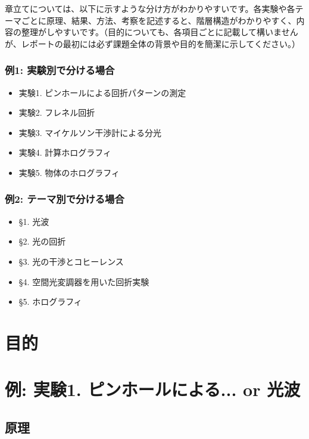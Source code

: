 \documentclass[uplatex,dvipdfmx,a4j,12pt]{jsarticle}
\begin{document}
章立てについては、以下に示すような分け方がわかりやすいです。各実験や各テーマごとに原理、結果、方法、考察を記述すると、階層構造がわかりやすく、内容の整理がしやすいです。（目的についても、各項目ごとに記載して構いませんが、レポートの最初には必ず課題全体の背景や目的を簡潔に示してください。）

\subsubsection*{例1: 実験別で分ける場合}
    \begin{itemize}
        \item 実験1. ピンホールによる回折パターンの測定
        \item 実験2. フレネル回折
        \item 実験3. マイケルソン干渉計による分光
        \item 実験4. 計算ホログラフィ
        \item 実験5. 物体のホログラフィ
    \end{itemize}

\subsubsection*{例2: テーマ別で分ける場合}
    \begin{itemize}
        \item \S 1. 光波
        \item \S 2. 光の回折
        \item \S 3. 光の干渉とコヒーレンス
        \item \S 4. 空間光変調器を用いた回折実験
        \item \S 5. ホログラフィ
    \end{itemize}

\newpage

\section{目的}

\section{例: 実験1. ピンホールによる... or 光波}
\subsection{原理}
\end{document}
